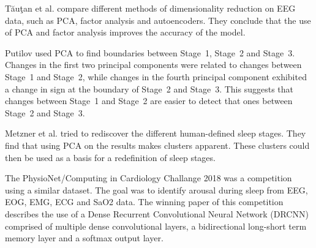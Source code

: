 Tăuţan et al.\cite{Tautan2021} compare different methods of dimensionality reduction on EEG data, such as PCA, factor analysis and autoencoders. They conclude that the use of PCA and factor analysis improves the accuracy of the model.

Putilov\cite{Putilov2015} used PCA to find boundaries between Stage~1, Stage~2 and Stage~3. Changes in the first two principal components were related to changes between Stage~1 and Stage~2, while changes in the fourth principal component exhibited a change in sign at the boundary of Stage~2 and Stage~3. This suggests that changes between Stage~1 and Stage~2 are easier to detect that ones between Stage~2 and Stage~3.

Metzner et al.\cite{Metzner2023} tried to rediscover the different human-defined sleep stages. They find that using PCA on the results makes clusters apparent. These clusters could then be used as a basis for a redefinition of sleep stages.

The PhysioNet/Computing in Cardiology Challange 2018\cite{Ghassemi2018} was a competition using a similar dataset. The goal was to identify arousal during sleep from EEG, EOG, EMG, ECG and SaO2 data. The winning paper\cite{Howe2018} of this competition describes the use of a Dense Recurrent Convolutional Neural Network (DRCNN) comprised of multiple dense convolutional layers, a bidirectional long-short term memory layer and a softmax output layer.
